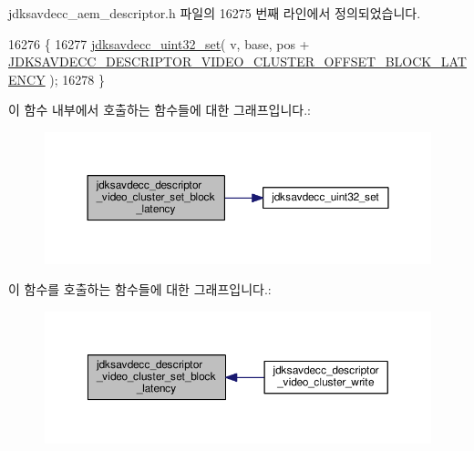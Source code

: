 jdksavdecc\+\_\+aem\+\_\+descriptor.\+h 파일의 16275 번째 라인에서 정의되었습니다.


\begin{DoxyCode}
16276 \{
16277     \hyperlink{group__endian_ga59b24ae6f7f47ca4d24ea337543162bf}{jdksavdecc\_uint32\_set}( v, base, pos + 
      \hyperlink{group__descriptor__video__cluster_gaf9c0cc92b56856d260479239856ecd50}{JDKSAVDECC\_DESCRIPTOR\_VIDEO\_CLUSTER\_OFFSET\_BLOCK\_LATENCY}
       );
16278 \}
\end{DoxyCode}


이 함수 내부에서 호출하는 함수들에 대한 그래프입니다.\+:
\nopagebreak
\begin{figure}[H]
\begin{center}
\leavevmode
\includegraphics[width=350pt]{group__descriptor__video__cluster_ga1ac3418ff127705510f8af413f5678d1_cgraph}
\end{center}
\end{figure}




이 함수를 호출하는 함수들에 대한 그래프입니다.\+:
\nopagebreak
\begin{figure}[H]
\begin{center}
\leavevmode
\includegraphics[width=350pt]{group__descriptor__video__cluster_ga1ac3418ff127705510f8af413f5678d1_icgraph}
\end{center}
\end{figure}


